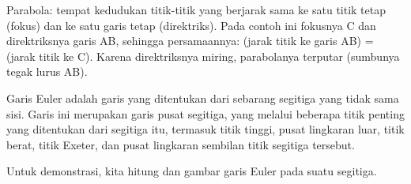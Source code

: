 \documentclass[a4paper,10pt]{article}
\begin{document}
\begin{eulernotebook}
\begin{eulercomment}
\begin{eulercomment}
\begin{eulercomment}
\begin{eulercomment}
\begin{eulercomment}
\begin{eulercomment}
\begin{eulercomment}
\begin{eulercomment}
\begin{eulercomment}
\begin{eulercomment}
\begin{eulercomment}
Parabola: tempat kedudukan titik-titik yang berjarak sama ke satu titik tetap (fokus) dan ke
satu garis tetap (direktriks). Pada contoh ini fokusnya C dan direktriksnya garis AB, sehingga
persamaannya: (jarak titik ke garis AB) = (jarak titik ke C). Karena direktriksnya miring,
parabolanya terputar (sumbunya tegak lurus AB).

\end{eulercomment}
\begin{eulercomment}
Garis Euler adalah garis yang ditentukan dari sebarang segitiga yang tidak sama sisi. Garis ini
merupakan garis pusat segitiga, yang melalui beberapa titik penting yang ditentukan dari
segitiga itu, termasuk titik tinggi, pusat lingkaran luar, titik berat, titik Exeter, dan
pusat lingkaran sembilan titik segitiga tersebut.

Untuk demonstrasi, kita hitung dan gambar garis Euler pada suatu segitiga.


\end{eulercomment}
\end{eulercomment}
\end{eulercomment}
\end{eulercomment}
\end{eulercomment}
\end{eulercomment}
\end{eulercomment}
\end{eulercomment}
\end{eulercomment}
\end{eulercomment}
\end{eulercomment}
\end{eulernotebook}
\end{document}
